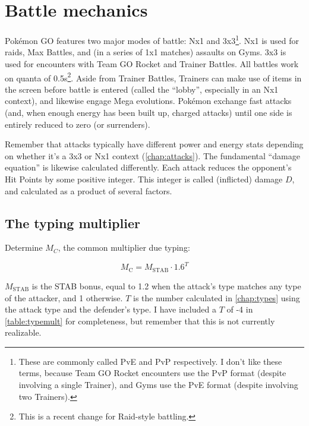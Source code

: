 \chapter{Battle mechanics\label{chap:battle}}
\nopagecolor
Pokémon GO features two major modes of battle: Nx1 and 3x3\footnote{These are commonly called PvE and PvP
 respectively. I don't like these terms, because Team GO Rocket encounters use the PvP format (despite involving
 a single Trainer), and Gyms use the PvE format (despite involving two Trainers).}.
Nx1 is used for raids, Max Battles, and (in a series of 1x1 matches) assaults on Gyms.
3x3 is used for encounters with Team GO Rocket and Trainer Battles.
All battles work on quanta of 0.5s\footnote{This is a recent change for Raid-style battling.}.
Aside from Trainer Battles, Trainers can make use of items in the screen before
  battle is entered (called the ``lobby'', especially in an Nx1 context), and
  likewise engage Mega evolutions.
Pokémon exchange fast attacks (and, when enough energy has been built up, charged attacks)
  until one side is entirely reduced to zero \HP{} (or surrenders).

Remember that attacks typically have different power and energy stats depending on
  whether it's a 3x3 or Nx1 context (\autoref{chap:attacks}).
The fundamental ``damage equation'' is likewise calculated differently.
Each attack reduces the opponent's Hit Points by some positive integer.
This integer is called (inflicted) damage $D$, and calculated as a product of several factors.

\section{The typing multiplier\label{sec:typemult}}
Determine $M_C$, the common multiplier due typing:

\[ M_\mathrm{C} = M_\mathrm{STAB} \cdot 1.6^{T} \]

$M_\mathrm{STAB}$ is the STAB bonus, equal to 1.2 when the attack's type matches any
  type of the attacker, and 1 otherwise.
$T$ is the number calculated in \autoref{chap:types} using the attack type
 and the defender's type.
I have included a $T$ of -4 in \autoref{table:typemult} for completeness,
 but remember that this is not currently realizable.

